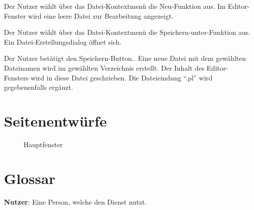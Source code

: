 \documentclass[parskip=full,11pt,twoside]{scrartcl}
\begin{document}
{Der Nutzer wählt über das Datei-Kontextmenü die Neu-Funktion aus.}
{Im Editor-Fenster wird eine leere Datei zur Bearbeitung angezeigt.}

{Der Nutzer wählt über das Datei-Kontextmenü die Speichern-unter-Funktion aus.}
{Ein Datei-Erstellungsdialog öffnet sich.}

{Der Nutzer betätigt den Speichern-Button..}
{Eine neue Datei mit dem gewählten Dateinamen wird im gewählten Verzeichnis erstellt. Der Inhalt des Editor-Fensters wird in diese Datei geschrieben. Die Dateieindung \enquote{.pl} wird gegebenenfalls ergänzt.}

\pagebreak
\appendix

\section{Seitenentwürfe}

\begin{figure}[hb]
\caption{\label{fig:editor}
Hauptfenster
}
\end{figure}

\section{Glossar}

\textbf{Nutzer}:
Eine Person, welche den Dienst nutzt.
\end{document}
